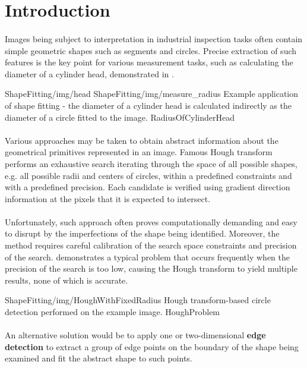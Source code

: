 \section{Introduction}

\paragraph*{}
Images being subject to interpretation in industrial inspection tasks often contain simple geometric shapes such as segments and circles. Precise extraction of such features is the key point for various measurement tasks, such as calculating the diameter of a cylinder head, demonstrated in .

\twoFigures
{ShapeFitting/img/head}
{ShapeFitting/img/measure_radius}
{Example application of shape fitting - the diameter of a cylinder head is calculated indirectly as the diameter of a circle fitted to the image.}
{RadiusOfCylinderHead}
{\basicWidth}


\paragraph*{}
Various approaches may be taken to obtain abstract information about the geometrical primitives represented in an image. Famous Hough transform performs an exhaustive search iterating through the space of all possible shapes, e.g. all possible radii and centers of circles, within a predefined constraints and with a predefined precision. Each candidate is verified using gradient direction information at the pixels that it is expected to intersect.

\paragraph*{}
Unfortunately, such approach often proves computationally demanding and easy to disrupt by the imperfections of the shape being identified. Moreover, the method requires careful calibration of the search space constraints and precision of the search.  demonstrates a typical problem that occurs frequently when the precision of the search is too low, causing the Hough transform to yield multiple results, none of which is accurate.

\oneFigure
{ShapeFitting/img/HoughWithFixedRadius}
{Hough transform-based circle detection performed on the example image.}
{HoughProblem}
{\basicWidth}

\paragraph*{}
An alternative solution would be to apply one or two-dimensional \textbf{edge detection} to extract a group of edge points on the boundary of the shape being examined and fit the abstract shape to such points.

